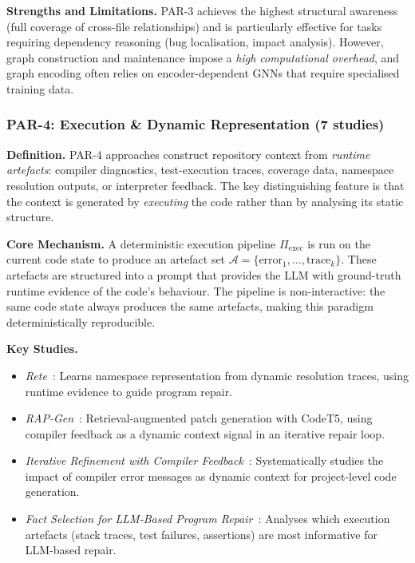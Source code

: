 \documentclass[acmsmall,screen,review]{acmart}
\begin{document}
\textbf{Strengths and Limitations.}
PAR-3 achieves the highest structural awareness (full coverage of
cross-file relationships) and is particularly effective for tasks
requiring dependency reasoning (bug localisation, impact analysis).
However, graph construction and maintenance impose a \emph{high
computational overhead}, and graph encoding often relies on
encoder-dependent GNNs that require specialised training data.

\subsubsection{PAR-4: Execution \& Dynamic Representation
  (7 studies)}
\label{subsubsec:par4}

\textbf{Definition.} PAR-4 approaches construct repository context
from \emph{runtime artefacts}: compiler diagnostics, test-execution
traces, coverage data, namespace resolution outputs, or interpreter
feedback. The key distinguishing feature is that the context is
generated by \emph{executing} the code rather than by analysing its
static structure.

\textbf{Core Mechanism.} A deterministic execution pipeline
$\Pi_{\text{exec}}$ is run on the current code state to produce an
artefact set $\mathcal{A} = \{\text{error}_{1}, \ldots,
\text{trace}_{k}\}$. These artefacts are structured into a prompt that
provides the LLM with ground-truth runtime evidence of the code's
behaviour. The pipeline is non-interactive: the same code state always
produces the same artefacts, making this paradigm deterministically
reproducible.

\textbf{Key Studies.}
\begin{itemize}
  \item \textit{Rete}~\cite{Parasaram2023Rete}: Learns namespace
    representation from dynamic resolution traces, using runtime
    evidence to guide program repair.
  \item \textit{RAP-Gen}~\cite{Wang2023RAPGen}: Retrieval-augmented
    patch generation with CodeT5, using compiler feedback as a
    dynamic context signal in an iterative repair loop.
  \item \textit{Iterative Refinement with Compiler
    Feedback}~\cite{Bi2024CompilerFeedback}: Systematically studies the
    impact of compiler error messages as dynamic context for project-level
    code generation.
  \item \textit{Fact Selection for LLM-Based Program
    Repair}~\cite{Parasaram2025Facts}: Analyses which execution artefacts
    (stack traces, test failures, assertions) are most informative for
    LLM-based repair.
\end{itemize}
\end{document}
